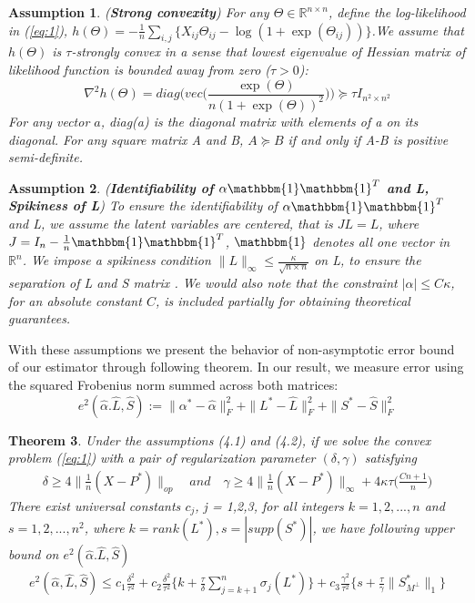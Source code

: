 \documentclass{article}
\newtheorem{theorem}{Theorem}[section]
\newtheorem{assumption}[theorem]{Assumption}
\begin{document}
\begin{assumption} (\textbf{Strong convexity})
For any $\Theta \in \mathbb{R}^{n\times n}$, define the log-likelihood in (\ref{eq:1}), $h(\Theta) = -\frac{1}{n}\sum_{i,j} \big\{ X_{ij}\Theta_{ij} - \log(1+\exp(\Theta_{ij})) \big\}$.We assume that $h(\Theta)$ is $\tau$-strongly convex in a sense that lowest eigenvalue of Hessian matrix of likelihood function is bounded away from zero ($\tau > 0$):  
\[
\nabla^{2}h(\Theta) = diag\Big(vec\Big(\frac{\exp(\Theta)}{n(1+\exp(\Theta))^{2}}
\Big)\Big) \succcurlyeq \tau I_{n^{2} \times n^{2}}
\]
For any vector $a$, diag(a) is the diagonal matrix with elements of a on its diagonal. For any square matrix A and B, $ A \succcurlyeq B $ if and only if A-B is positive semi-definite.
\end{assumption}

\begin{assumption} (\textbf{Identifiability of $\alpha\mathbbm{1}\mathbbm{1}^T$ and L, Spikiness of L})
To ensure the identifiability of $\alpha\mathbbm{1}\mathbbm{1}^T$ and L, we assume the latent variables are centered, that is $JL=L$, where $J=I_{n}-\frac{1}{n}\mathbbm{1}\mathbbm{1}^T$, $\mathbbm{1}$ denotes all one vector in $\mathbb{R}^{n}$. We impose a spikiness condition $\|L\|_{\infty}\leq\frac{\kappa}{\sqrt{n \times n}}$ on L, to ensure the separation of L and S matrix \cite{agarwal2012noisy}. We would also note that the constraint $|\alpha|\leq C\kappa$, for an absolute constant $C$, is included partially for obtaining theoretical guarantees.
\end{assumption}

With these assumptions we present the behavior of non-asymptotic error bound of our estimator through following theorem. In our result, we measure error using the squared Frobenius norm summed across both matrices:
\[
    e^{2}(\hat{\alpha}.\hat{L},\hat{S}):=\|\alpha^{*}-\hat{\alpha}\|_{F}^{2} + \|L^{*}-\hat{L}\|_{F}^{2} + \|S^{*}-\hat{S}\|_{F}^{2}
\]

\begin{theorem}
Under the assumptions (4.1) and (4.2),
if we solve the convex problem (\ref{eq:1}) with a pair of regularization parameter $(\delta,\gamma)$ satisfying 
\begin{align}
\delta \geq 4\|\frac{1}{n}(X-P^{*})\|_{op} \quad and \quad \gamma \geq 4\|\frac{1}{n}(X-P^{*})\|_{\infty}+4\kappa\tau\bigg(\frac{Cn+1}{n} \bigg)
\end{align}
There exist universal constants $c_{j}$, j = 1,2,3,  for all integers $k = 1,2,...,n$ and $s = 1,2,...,n^{2}$, where $k = rank(L^{*}), s= |supp(S^{*})|$, we have following upper bound on $e^{2}(\hat{\alpha}.\hat{L},\hat{S})$
\begin{align}
    e^{2}(\hat{\alpha},\hat{L},\hat{S}) \leq
    c_{1}\frac{\delta^{2}}{\tau^{2}} +
    c_{2}\frac{\delta^{2}}{\tau^{2}}
    \bigg\{k + \frac{\tau}{\delta}\sum_{j=k+1}^{n}\sigma_{j}(L^{*})\bigg\} +
    c_{3}\frac{\gamma^{2}}{\tau^{2}}
    \bigg\{s + \frac{\tau}{\gamma}\|S^*_{M^\perp}\|_{1}\bigg\}
\end{align}
\end{theorem}
\end{document}
